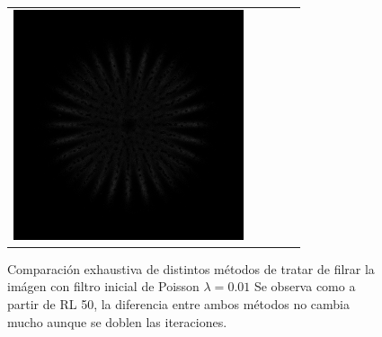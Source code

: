 \documentclass{./packages/optica-article}
\begin{document}
\begin{figure}
\begin{tabular}{c c | c c c}
		\includegraphics[scale=0.25]{Simulation deconvolution/ref_np_0.01/RL_50_mins_RL_100}
	\end{tabular}
	\caption{Comparación exhaustiva de distintos métodos de tratar de filrar la imágen con filtro inicial de Poisson $\lambda = 0.01$ Se observa como a partir de RL 50, la diferencia entre ambos métodos no cambia mucho aunque se doblen las iteraciones. }\label{fig:filtros:comparacion}

\end{figure}

\end{document}
